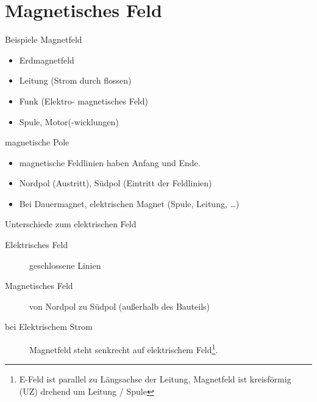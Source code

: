 
\section[Magnete]{Magnetisches Feld}
\begin{frame}{Beispiele Magnetfeld}
 \begin{itemize}
  \item Erdmagnetfeld
  \item Leitung (Strom durch flossen)
  \item Funk (Elektro- magnetisches Feld)
  \item Spule, Motor(-wicklungen)
 \end{itemize}
\end{frame}

\begin{frame}{magnetische Pole}
 \begin{itemize}
  \item magnetische Feldlinien haben Anfang und Ende.
  \item Nordpol (Austritt), Südpol (Eintritt der Feldlinien)
  \item Bei Dauermagnet, elektrischen Magnet (Spule, Leitung, \dots)
 \end{itemize}
\end{frame}

\begin{frame}{Unterschiede zum elektrischen Feld}
  \begin{description}
   \item[Elektrisches Feld] geschlossene Linien
   \item[Magnetisches Feld] von Nordpol zu Südpol (außerhalb des Bauteils)
   \item[bei Elektrischem Strom] Magnetfeld steht senkrecht auf elektrischem Feld\footnote{E-Feld ist parallel zu Längsachse der Leitung, Magnetfeld ist kreisförmig (UZ) drehend um Leitung / Spule}.
  \end{description}
\end{frame}

